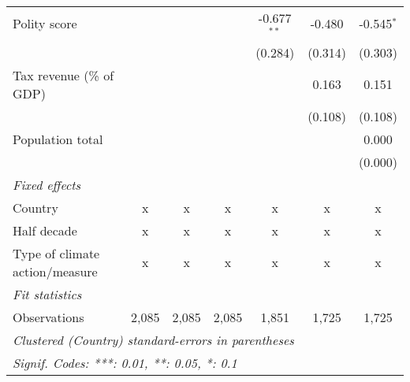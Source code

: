 \begin{tabular}{lcccccc}
   Polity score                                                           &             &         &         & -0.677$^{**}$ & -0.480       & -0.545$^{*}$\\   
                                                                          &             &         &         & (0.284)       & (0.314)      & (0.303)\\   
   Tax revenue (\% of GDP)                                                &             &         &         &               & 0.163        & 0.151\\   
                                                                          &             &         &         &               & (0.108)      & (0.108)\\   
   Population total                                                       &             &         &         &               &              & 0.000\\   
                                                                          &             &         &         &               &              & (0.000)\\   
   \emph{Fixed effects}\\
   Country                                                                & x           & x       & x       & x             & x            & x\\  
   Half decade                                                            & x           & x       & x       & x             & x            & x\\  
   Type of climate action/measure                                         & x           & x       & x       & x             & x            & x\\  
   \midrule \emph{Fit statistics}\\
   Observations                                                           & 2,085       & 2,085   & 2,085   & 1,851         & 1,725        & 1,725\\  
   \midrule
   \multicolumn{7}{l}{\emph{Clustered (Country) standard-errors in parentheses}}\\
   \multicolumn{7}{l}{\emph{Signif. Codes: ***: 0.01, **: 0.05, *: 0.1}}\\
\end{tabular}
\par\endgroup


